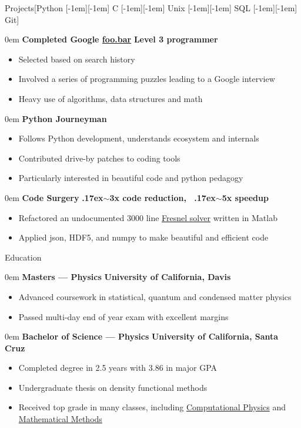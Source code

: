 \documentclass[11pt,a4paper]{article}
\newenvironment{headedsection}[2]{
    \begin{addmargin}[0.5em]{0em}
    {\large\bfseries #1} \hfill {\bfseries #2}%
    \begin{itemize}
        [label={}, topsep=0pt, itemsep=1.5pt, parsep=0pt, leftmargin=1.5em]
}{
    \end{itemize}
    \end{addmargin}
    \medskip
}
\newcommand*\sbull{\raisebox{-0.550ex}[-1em][-1em]{\textscale{4}{\( \cdot \)}}\xspace}
\newcommand{\mytilde}{\raise.17ex\hbox{$\scriptstyle\sim$}}
\begin{document}
\begin{mysection}{Projects}[Python \sbull C \sbull Unix \sbull SQL \sbull Git]

    \begin{headedsection}{Completed Google \href{https://news.ycombinator.com/item?id=8588080}{foo.bar}}
          {Level 3 programmer}

        \item Selected based on search history
        \item Involved a series of programming puzzles leading to a Google interview
        \item Heavy use of algorithms, data structures and math
    \end{headedsection}

    \begin{headedsection}{Python Journeyman}{}
        \item Follows Python development, understands ecosystem and internals
        \item Contributed drive-by patches to coding tools
        \item Particularly interested in beautiful code and python pedagogy
    \end{headedsection}

    \begin{headedsection}{Code Surgery}
          {\mytilde{}3x code reduction, \ \mytilde{}5x speedup}

        \item Refactored an undocumented 3000 line \href{https://en.wikipedia.org/wiki/Fresnel_equations}{Fresnel solver} written in Matlab
        \item Applied json, HDF5, and numpy to make beautiful and efficient code
    \end{headedsection}
\end{mysection}

\begin{mysection}{Education}
    \begin{headedsection}{Masters --- Physics}
          {University of California, Davis}

        \item Advanced coursework in statistical, quantum and condensed matter physics
        \item Passed multi-day end of year exam with excellent margins
    \end{headedsection}

    \begin{headedsection}{Bachelor of Science --- Physics}
          {University of California, Santa Cruz}

        \item Completed degree in 2.5 years with 3.86 in major GPA
        \item Undergraduate thesis on density functional methods
        \item Received top grade in many classes, including \href{http://young.physics.ucsc.edu/115/}{Computational Physics} and \href{http://scipp.ucsc.edu/~haber/ph116C/}{Mathematical Methods}
    \end{headedsection}
\end{mysection}
\end{document}
